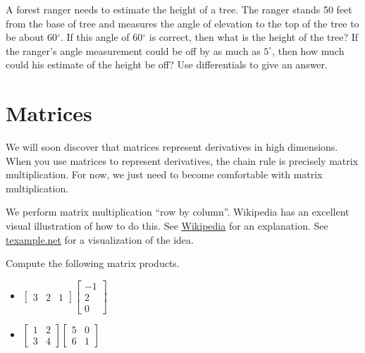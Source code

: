 \begin{problem}
A forest ranger needs to estimate the height of a tree.  The ranger stands 50 feet from the base of tree and measures the angle of elevation to the top of the tree to be about 60$^\circ$. If this angle of 60$^\circ$ is correct, then what is the height of the tree? If the ranger's angle measurement could be off by as much as $5^\circ$, then how much could his estimate of the height be off? Use differentials to give an answer.
\end{problem}



\section{Matrices}\label{review matrices}
We will soon discover that matrices represent derivatives in high dimensions. When you use matrices to represent derivatives, the chain rule is precisely matrix multiplication. For now, we just need to become comfortable with matrix multiplication.

We perform matrix multiplication ``row by column''.  Wikipedia has an excellent visual illustration of how to do this. See 
\href{http://en.wikipedia.org/wiki/Matrix\_multiplication}{Wikipedia} for an explanation. See \href{http://www.texample.net/tikz/examples/matrix-multiplication/}{texample.net} for a visualization of the idea.

\begin{problem} 
Compute the following matrix products.
\begin{itemize}
\item $\begin{bmatrix}
3 & 2& 1
\end{bmatrix}
\begin{bmatrix}
-1 \\
 2\\
 0
\end{bmatrix}$
\item
$\begin{bmatrix}1 &2\\3&4\end{bmatrix}\begin{bmatrix}5&0\\6&1\end{bmatrix}$
\end{itemize} \end{problem}


